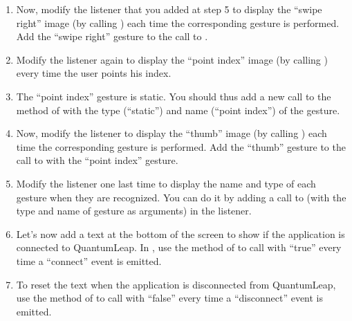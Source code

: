 \begin{enumerate}
    \item Now, modify the listener that you added at step 5 to display the ``swipe right'' image (by calling ) each time the corresponding gesture is performed. Add the ``swipe right'' gesture to the call to .
    \item Modify the listener again to display the ``point index'' image (by calling ) every time the user points his index.
    \item The ``point index'' gesture is static. You should thus add a new call to the  method of  with the type (``static'') and name (``point index'') of the gesture.
    \item Now, modify the listener to display the ``thumb'' image (by calling ) each time the corresponding gesture is performed. Add the ``thumb'' gesture to the call to  with the ``point index'' gesture.
    \item Modify the listener one last time to display the name and type of each gesture when they are recognized. You can do it by adding a call to  (with the type and name of gesture as arguments) in the listener.
    \item Let's now add a text at the bottom of the screen to show if the application is connected to QuantumLeap. In , use the  method of  to call  with ``true'' every time a ``connect'' event is emitted.
    \item To reset the text when the application is disconnected from QuantumLeap, use the  method of  to call  with ``false'' every time a ``disconnect'' event is emitted.
\end{enumerate}